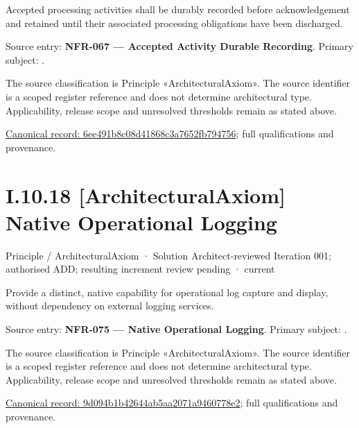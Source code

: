 Accepted processing activities shall be durably recorded before acknowledgement and retained until their associated processing obligations have been discharged.



Source entry: \textbf{NFR-067 — Accepted Activity Durable Recording}. Primary subject: \texttt{}.



The source classification is Principle «ArchitecturalAxiom». The source identifier is a scoped register reference and does not determine architectural type. Applicability, release scope and unresolved thresholds remain as stated above.


{\footnotesize \href{../../../../../../../continuum/motivation/principle/architectural-axiom/6ee491b8c08d41868c3a7652fb794756.md}{Canonical record: 6ee491b8c08d41868c3a7652fb794756}; full qualifications and provenance.}\par
\section*{I.10.18 [ArchitecturalAxiom] Native Operational Logging}
\label{navigation:I.10.18}

\label{element:9d094b1b42644ab5aa2071a9460778e2}
{\small Principle / ArchitecturalAxiom · Solution Architect-reviewed Iteration 001; authorised ADD; resulting increment review pending · current}\par

Provide a distinct, native capability for operational log capture and display, without dependency on external logging services.



Source entry: \textbf{NFR-075 — Native Operational Logging}. Primary subject: \texttt{}.



The source classification is Principle «ArchitecturalAxiom». The source identifier is a scoped register reference and does not determine architectural type. Applicability, release scope and unresolved thresholds remain as stated above.


{\footnotesize \href{../../../../../../../continuum/motivation/principle/architectural-axiom/9d094b1b42644ab5aa2071a9460778e2.md}{Canonical record: 9d094b1b42644ab5aa2071a9460778e2}; full qualifications and provenance.}\par
